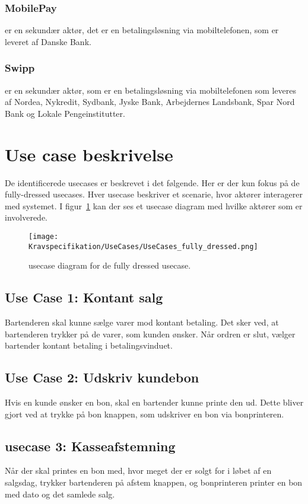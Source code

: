 \subsubsection*{MobilePay} 
er en sekundær aktør, det er en betalingsløsning via mobiltelefonen, som er leveret af Danske Bank.

\subsubsection*{Swipp} 
er en sekundær aktør, som er en betalingsløsning via mobiltelefonen som leveres af Nordea, Nykredit, Sydbank, Jyske Bank, Arbejdernes Landsbank, Spar Nord Bank og Lokale Pengeinstitutter.

\newpage

\section{Use case beskrivelse}
De identificerede \gls{usecase}s er beskrevet i det følgende. Her er der kun fokus på de fully-dressed \gls{usecase}s. Hver \gls{usecase} beskriver et scenarie, hvor aktører interagerer med systemet. I figur~\ref{fig:fullydressedusecases} kan der ses et \gls{usecase} diagram med hvilke aktører som er involverede.

\begin{figure}[H]
	\centering
	\texttt{[image: Kravspecifikation/UseCases/UseCases\_fully\_dressed.png]}
	\caption{\gls{usecase} diagram for de fully dressed \gls{usecase}.}
	\label{fig:fullydressedusecases}
\end{figure} 

\subsection*{Use Case 1: Kontant salg}
Bartenderen skal kunne sælge varer mod kontant betaling. Det sker ved, at bartenderen trykker på de varer, som kunden ønsker. Når ordren er slut, vælger \gls{bartender} kontant betaling i betalingsvinduet.

\subsection*{Use Case 2: Udskriv kundebon}
Hvis en kunde ønsker en bon, skal en \gls{bartender} kunne printe den ud. Dette bliver gjort ved at trykke på bon knappen, som udskriver en bon via bonprinteren.

\subsection*{\gls{usecase} 3: Kasseafstemning}
Når der skal printes en bon med, hvor meget der er solgt for i løbet af en salgsdag, trykker bartenderen på afstem knappen, og bonprinteren printer en bon med dato og det samlede salg. 

